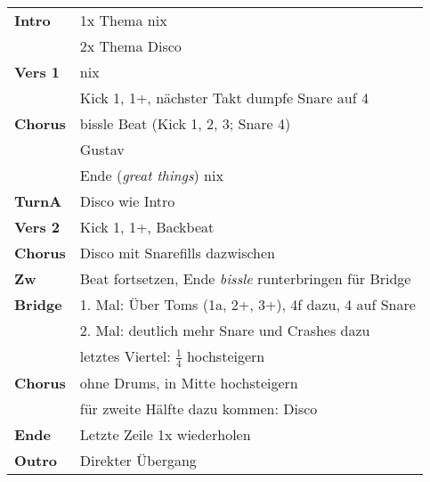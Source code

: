 
\begin{tabular}{p{1.6cm}l}
	\textbf{Intro}  & 1x Thema nix                                                   \\
	                & 2x Thema Disco                                                 \\
	\textbf{Vers 1} & nix                                                            \\
	                & Kick 1, 1+, nächster Takt dumpfe Snare auf 4                   \\
	\textbf{Chorus} & bissle Beat (Kick 1, 2, 3; Snare 4)                            \\
	                & Gustav                                                         \\
	                & Ende (\textit{great things}) nix                               \\
	\textbf{TurnA}  & Disco wie Intro                                                \\
	\textbf{Vers 2} & Kick 1, 1+, Backbeat                                           \\
	\textbf{Chorus} & Disco mit Snarefills dazwischen                                \\
	\textbf{Zw}     & Beat fortsetzen, Ende \textit{bissle} runterbringen für Bridge \\
	\textbf{Bridge} & 1. Mal: Über Toms (1a, 2+, 3+), 4f dazu, 4 auf Snare           \\
	                & 2. Mal: deutlich mehr Snare und Crashes dazu                   \\
	                & letztes Viertel: $\frac{1}{4}$ hochsteigern                    \\
	\textbf{Chorus} & ohne Drums, in Mitte hochsteigern                              \\
	                & für zweite Hälfte dazu kommen: Disco                           \\
	\textbf{Ende}   & Letzte Zeile 1x wiederholen                                    \\
	\textbf{Outro}  & Direkter Übergang                                              \\
\end{tabular}
